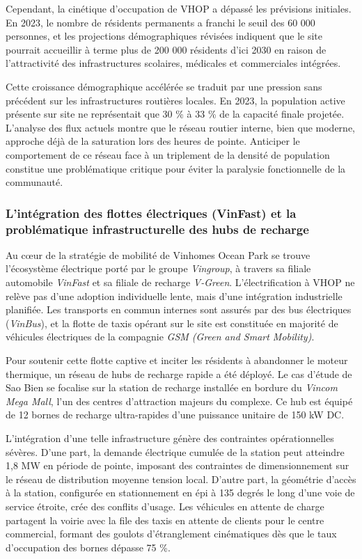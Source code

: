 \documentclass[10pt, a4paper]{article}
\begin{document}
Cependant, la cinétique d'occupation de VHOP a dépassé les prévisions
initiales. En 2023, le nombre de résidents permanents a franchi le seuil
des 60 000 personnes, et les projections démographiques révisées
indiquent que le site pourrait accueillir à terme plus de 200 000
résidents d'ici 2030 en raison de l'attractivité des infrastructures
scolaires, médicales et commerciales intégrées.

Cette croissance démographique accélérée se traduit par une pression
sans précédent sur les infrastructures routières locales. En 2023, la
population active présente sur site ne représentait que 30 \% à 33 \% de
la capacité finale projetée. L'analyse des flux actuels montre que le
réseau routier interne, bien que moderne, approche déjà de la saturation
lors des heures de pointe. Anticiper le comportement de ce réseau face à
un triplement de la densité de population constitue une problématique
critique pour éviter la paralysie fonctionnelle de la communauté.

\subsubsection{L'intégration des flottes électriques (VinFast) et la
problématique infrastructurelle des hubs de
recharge}\label{lintuxe9gration-des-flottes-uxe9lectriques-vinfast-et-la-probluxe9matique-infrastructurelle-des-hubs-de-recharge}

Au cœur de la stratégie de mobilité de Vinhomes Ocean Park se trouve
l'écosystème électrique porté par le groupe \emph{Vingroup}, à travers
sa filiale automobile \emph{VinFast} et sa filiale de recharge
\emph{V-Green}. L'électrification à VHOP ne relève pas d'une adoption
individuelle lente, mais d'une intégration industrielle planifiée. Les
transports en commun internes sont assurés par des bus électriques
(\emph{VinBus}), et la flotte de taxis opérant sur le site est
constituée en majorité de véhicules électriques de la compagnie
\emph{GSM (Green and Smart Mobility)}.

Pour soutenir cette flotte captive et inciter les résidents à abandonner
le moteur thermique, un réseau de hubs de recharge rapide a été déployé.
Le cas d'étude de Sao Bien se focalise sur la station de recharge
installée en bordure du \emph{Vincom Mega Mall}, l'un des centres
d'attraction majeurs du complexe. Ce hub est équipé de 12 bornes de
recharge ultra-rapides d'une puissance unitaire de 150 kW DC.

L'intégration d'une telle infrastructure génère des contraintes
opérationnelles sévères. D'une part, la demande électrique cumulée de la
station peut atteindre 1,8 MW en période de pointe, imposant des
contraintes de dimensionnement sur le réseau de distribution moyenne
tension local. D'autre part, la géométrie d'accès à la station,
configurée en stationnement en épi à 135 degrés le long d'une voie de
service étroite, crée des conflits d'usage. Les véhicules en attente de
charge partagent la voirie avec la file des taxis en attente de clients
pour le centre commercial, formant des goulots d'étranglement
cinématiques dès que le taux d'occupation des bornes dépasse 75 \%.
\end{document}
